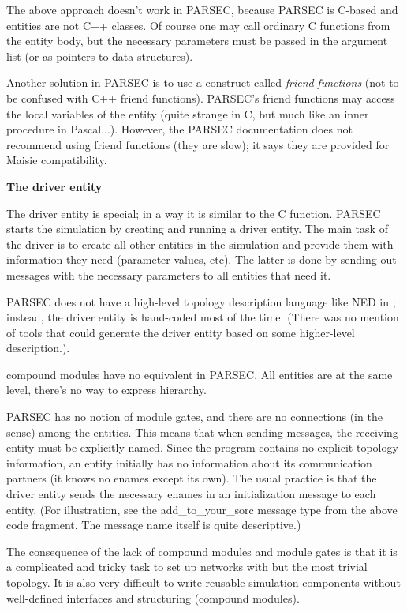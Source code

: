 The above approach doesn't work in PARSEC, because PARSEC is
C-based and entities are not C++ classes. Of course one may call
ordinary C functions from the entity body, but the necessary
parameters must be passed in the argument list (or as pointers
to data structures).

Another solution in PARSEC is to use a construct called \textit{friend} \textit{functions}
(not to be confused with C++ friend functions). PARSEC's friend
functions may access the local variables of the entity (quite
strange in C, but much like an inner procedure in Pascal...).
However, the PARSEC documentation does not recommend using friend
functions (they are slow); it says they are provided for Maisie
compatibility.


\textbf{The driver entity}


The driver entity is special; in a way it is similar to the C 
function. PARSEC starts the simulation by creating and running
a driver entity. The main task of the driver is to create all
other entities in the simulation and provide them with information
they need (parameter values, etc). The latter is done by sending
out messages with the necessary parameters to all entities that
need it.


PARSEC does not have a high-level topology description language
like NED in {\opp}; instead, the driver entity is hand-coded
most of the time. (There was no mention of tools that could generate
the driver entity based on some higher-level description.).


{\opp} compound modules have no equivalent in PARSEC. All entities are
at the same level, there's no way to express hierarchy.


PARSEC has no notion of module gates, and there are no connections
(in the {\opp} sense) among the entities. This means that when
sending messages, the receiving entity must be explicitly named.
Since the program contains no explicit topology information,
an entity initially has no information about its communication
partners (it knows no enames except its own). The usual practice
is that the driver entity sends the necessary enames in an initialization
message to each entity. (For illustration, see the add\_to\_your\_sorc
message type from the above code fragment. The message name itself
is quite descriptive.)

The consequence of the lack of compound modules and module gates is
that it is a complicated and tricky task to set up networks with but
the most trivial topology. It is also very difficult to write reusable
simulation components without well-defined interfaces and structuring
(compound modules).


